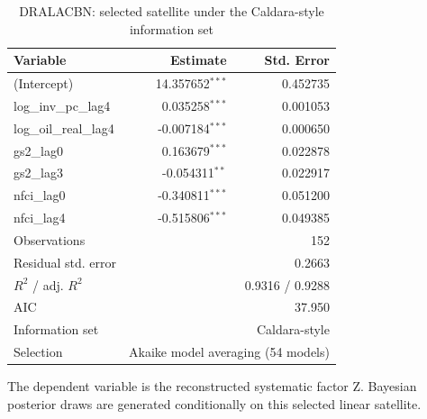 \begin{table}[!htbp]
\centering
\caption{DRALACBN: selected satellite under the Caldara-style information set}
\label{tab:dralacbn_caldara_style_satellite}
\begin{tabular}{lrr}
\toprule
Variable & Estimate & Std. Error \\
\midrule
(Intercept) & 14.357652$^{***}$ & 0.452735 \\
log_inv_pc_lag4 & 0.035258$^{***}$ & 0.001053 \\
log_oil_real_lag4 & -0.007184$^{***}$ & 0.000650 \\
gs2_lag0 & 0.163679$^{***}$ & 0.022878 \\
gs2_lag3 & -0.054311$^{**}$ & 0.022917 \\
nfci_lag0 & -0.340811$^{***}$ & 0.051200 \\
nfci_lag4 & -0.515806$^{***}$ & 0.049385 \\
\midrule
Observations & \multicolumn{2}{r}{152} \\
Residual std. error & \multicolumn{2}{r}{0.2663} \\
$R^2$ / adj. $R^2$ & \multicolumn{2}{r}{0.9316 / 0.9288} \\
AIC & \multicolumn{2}{r}{37.950} \\
Information set & \multicolumn{2}{r}{Caldara-style} \\
Selection & \multicolumn{2}{r}{Akaike model averaging (54 models)} \\
\bottomrule
\end{tabular}
\begin{tablenotes}
\small
\item The dependent variable is the reconstructed systematic factor Z. Bayesian posterior draws are generated conditionally on this selected linear satellite.
\end{tablenotes}
\end{table}

